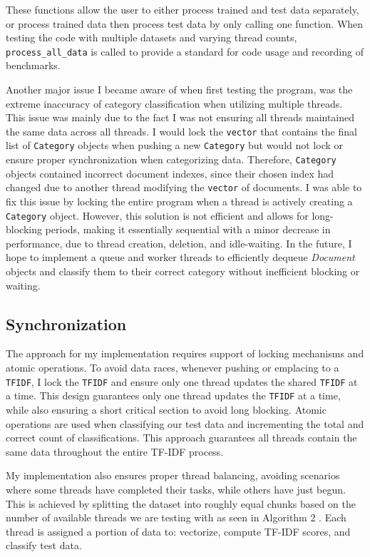 \documentclass[conference]{IEEEtran}
\newcommand{\code}[1]{\lstinline[basicstyle=\ttfamily]|#1|}
\begin{document}
These functions allow the user to either process trained and test data separately, or process trained data then process test data by only calling one function. When testing the code with multiple datasets and varying thread counts, \code{process_all_data} is called to provide a standard for code usage and recording of benchmarks.

Another major issue I became aware of when first testing the program, was the extreme inaccuracy of category classification when utilizing multiple threads. This issue was mainly due to the fact I was not ensuring all threads maintained the same data across all threads. I would lock the \code{vector} that contains the final list of \code{Category} objects when pushing a new \code{Category} but would not lock or ensure proper synchronization when categorizing data. Therefore, \code{Category} objects contained incorrect document indexes, since their chosen index had changed due to another thread modifying the \code{vector} of documents. I was able to fix this issue by locking the entire program when a thread is actively creating a \code{Category} object. However, this solution is not efficient and allows for long-blocking periods, making it essentially sequential with a minor decrease in performance, due to thread creation, deletion, and idle-waiting. In the future, I hope to implement a queue and worker threads to efficiently dequeue \textit{Document} objects and classify them to their correct category without inefficient blocking or waiting.

\subsection{Synchronization}
The approach for my implementation requires support of locking mechanisms and atomic operations. To avoid data races, whenever pushing or emplacing to a \code{TFIDF}, I lock the \code{TFIDF} and ensure only one thread updates the shared \code{TFIDF} at a time. This design guarantees only one thread updates the \code{TFIDF} at a time, while also ensuring a short critical section to avoid long blocking. Atomic operations are used when classifying our test data and incrementing the total and correct count of classifications. This approach guarantees all threads contain the same data throughout the entire TF-IDF process.

My implementation also ensures proper thread balancing, avoiding scenarios where some threads have completed their tasks, while others have just begun. This is achieved by splitting the dataset into roughly equal chunks based on the number of available threads we are testing with as seen in Algorithm 2 . Each thread is assigned a portion of data to: vectorize, compute TF-IDF scores, and classify test data.
\end{document}
